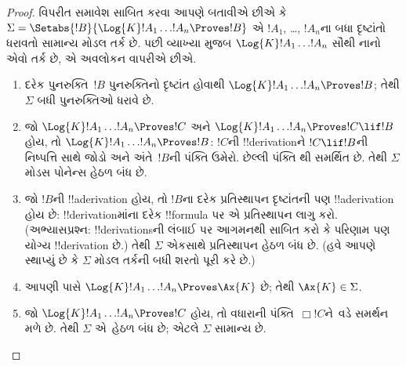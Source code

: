 \documentclass[../../../include/open-logic-section]{subfiles}
\begin{document}
\begin{proof}
  વિપરીત સમાવેશ સાબિત કરવા આપણે બતાવીએ છીએ કે
  $\Sigma = \Setabs{!B}{\Log{K} !A_1 \dots !A_n \Proves !B }$ એ
  $!A_1$, \dots, $!A_n$ના બધા દૃષ્ટાંતો ધરાવતો સામાન્ય મોડલ તર્ક છે.
  પછી વ્યાખ્યા મુજબ $\Log{K} !A_1 \dots !A_n$ સૌથી નાનો એવો તર્ક
  છે, એ અવલોકન વાપરીએ છીએ.
  \begin{enumerate}
    \item દરેક પુનરુક્તિ~$!B$ પુનરુક્તિનો દૃષ્ટાંત હોવાથી
      $\Log{K}!A_1\dots!A_n \Proves !B$; તેથી $\Sigma$ બધી
      પુનરુક્તિઓ ધરાવે છે.
    \item જો $\Log{K}!A_1\dots!A_n \Proves !C$ અને
      $\Log{K}!A_1\dots!A_n \Proves !C \lif !B$ હોય, તો
      $\Log{K}!A_1\dots!A_n \Proves !B$: $!C$ની !!{derivation}ને
      $!C \lif !B$ની નિષ્પત્તિ સાથે જોડો અને અંતે~$!B$ની પંક્તિ
      ઉમેરો. છેલ્લી પંક્તિ \MP{}થી સમર્થિત છે. તેથી $\Sigma$ મોડસ
      પોનેન્સ હેઠળ બંધ છે.
    \item જો $!B$ની !!a{derivation} હોય, તો $!B$ના દરેક પ્રતિસ્થાપન
      દૃષ્ટાંતની પણ !!a{derivation} હોય છે: !!{derivation}માંના દરેક
      !!{formula} પર એ પ્રતિસ્થાપન લાગુ કરો. (અભ્યાસપ્રશ્ન: !!{derivation}sની
      લંબાઈ પર આગમનથી સાબિત કરો કે પરિણામ પણ યોગ્ય !!{derivation} છે.)
      તેથી $\Sigma$ એકસાથે પ્રતિસ્થાપન હેઠળ બંધ છે. (હવે આપણે
      સ્થાપ્યું છે કે $\Sigma$ મોડલ તર્કની બધી શરતો પૂરી કરે છે.)
    \item આપણી પાસે $\Log{K}!A_1\dots!A_n \Proves \Ax{K}$ છે;
      તેથી $\Ax{K} \in \Sigma$.
    \item જો $\Log{K}!A_1\dots!A_n \Proves !C$ હોય, તો વધારાની
      પંક્તિ~$\Box !C$ને~\Nec વડે સમર્થન મળે છે. તેથી $\Sigma$
      એ~\Nec હેઠળ બંધ છે; એટલે $\Sigma$ સામાન્ય છે.
  \end{enumerate}
\end{proof}
\end{document}
